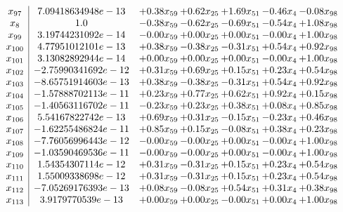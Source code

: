 \documentclass[8pt]{article}
\begin{document}
\[\begin{array}{c| c c@{\hskip 2pt} c@{\hskip 2pt} c@{\hskip 2pt} c@{\hskip 2pt} c@{\hskip 2pt} }
 x_{97}   &  7.09418634948e-13 & +  0.38 x_{59} & +  0.62 x_{25} & +  1.69 x_{51} & -0.46 x_{4} & -0.08 x_{98}\\
 x_{8}   &  1.0 & -0.38 x_{59} & -0.62 x_{25} & -0.69 x_{51} & -0.54 x_{4} & +  1.08 x_{98}\\
 x_{99}   &  3.19744231092e-14 & -0.00 x_{59} & +  0.00 x_{25} & +  0.00 x_{51} & -0.00 x_{4} & +  1.00 x_{98}\\
 x_{100}   &  4.77951012101e-13 & +  0.38 x_{59} & -0.38 x_{25} & -0.31 x_{51} & +  0.54 x_{4} & +  0.92 x_{98}\\
 x_{101}   &  3.13082892944e-14 & +  0.00 x_{59} & +  0.00 x_{25} & +  0.00 x_{51} & -0.00 x_{4} & +  1.00 x_{98}\\
 x_{102}   &  -2.75990341692e-12 & +  0.31 x_{59} & +  0.69 x_{25} & +  0.15 x_{51} & +  0.23 x_{4} & +  0.54 x_{98}\\
 x_{103}   &  -8.65751914603e-13 & +  0.38 x_{59} & -0.38 x_{25} & -0.31 x_{51} & +  0.54 x_{4} & +  0.92 x_{98}\\
 x_{104}   &  -1.57888702113e-11 & +  0.23 x_{59} & +  0.77 x_{25} & +  0.62 x_{51} & +  0.92 x_{4} & +  0.15 x_{98}\\
 x_{105}   &  -1.40563116702e-11 & -0.23 x_{59} & +  0.23 x_{25} & +  0.38 x_{51} & +  0.08 x_{4} & +  0.85 x_{98}\\
 x_{106}   &  5.54167822742e-13 & +  0.69 x_{59} & +  0.31 x_{25} & -0.15 x_{51} & -0.23 x_{4} & +  0.46 x_{98}\\
 x_{107}   &  -1.62255486824e-11 & +  0.85 x_{59} & +  0.15 x_{25} & -0.08 x_{51} & +  0.38 x_{4} & +  0.23 x_{98}\\
 x_{108}   &  -7.76056996443e-12 & -0.00 x_{59} & -0.00 x_{25} & +  0.00 x_{51} & -0.00 x_{4} & +  1.00 x_{98}\\
 x_{109}   &  -1.03590469536e-11 & -0.00 x_{59} & -0.00 x_{25} & +  0.00 x_{51} & -0.00 x_{4} & +  1.00 x_{98}\\
 x_{110}   &  1.54354307114e-12 & +  0.31 x_{59} & -0.31 x_{25} & +  0.15 x_{51} & +  0.23 x_{4} & +  0.54 x_{98}\\
 x_{111}   &  1.55009338698e-12 & +  0.31 x_{59} & -0.31 x_{25} & +  0.15 x_{51} & +  0.23 x_{4} & +  0.54 x_{98}\\
 x_{112}   &  -7.05269176393e-13 & +  0.08 x_{59} & -0.08 x_{25} & +  0.54 x_{51} & +  0.31 x_{4} & +  0.38 x_{98}\\
 x_{113}   &  3.9179770539e-13 & +  0.00 x_{59} & +  0.00 x_{25} & -0.00 x_{51} & +  0.00 x_{4} & +  1.00 x_{98}\\

\end{array}\]
\end{document}
